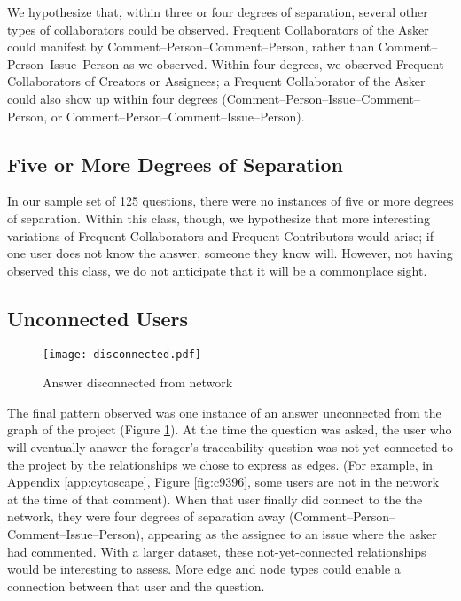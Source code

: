 We hypothesize that, within three or four degrees of separation, several other types of collaborators could be observed. Frequent Collaborators of the Asker could manifest by Comment--Person--Comment--Person, rather than Comment--Person--Issue--Person as we observed. Within four degrees, we observed Frequent Collaborators of Creators or Assignees; a Frequent Collaborator of the Asker could also show up within four degrees (Comment--Person--Issue--Comment--Person, or Comment--Person--Comment--Issue--Person). 


\subsection{Five or More Degrees of Separation}
In our sample set of 125 questions, there were no instances of five or more degrees of separation. Within this class, though, we hypothesize that more interesting variations of Frequent Collaborators and Frequent Contributors would arise; if one user does not know the answer, someone they know will. However, not having observed this class, we do not anticipate that it will be a commonplace sight.

\subsection{Unconnected Users}
\label{unconnectedusers}
\begin{figure}[ht]
	\centering
	\texttt{[image: disconnected.pdf]}
	\caption{Answer disconnected from network}
	\label{fig:disconnected}
\end{figure}

The final pattern observed was one instance of an answer unconnected from the graph of the project (Figure \ref{fig:disconnected}). At the time the question was asked, the user who will eventually answer the forager's traceability question was not yet connected to the project by the relationships we chose to express as edges. (For example, in Appendix \ref{app:cytoscape}, Figure \ref{fig:c9396}, some users are not in the network at the time of that comment). When that user finally did connect to the the network, they were four degrees of separation away (Comment--Person--Comment--Issue--Person), appearing as the assignee to an issue where the asker had commented. With a larger dataset, these not-yet-connected relationships would be interesting to assess. More edge and node types could enable a connection between that user and the question.

